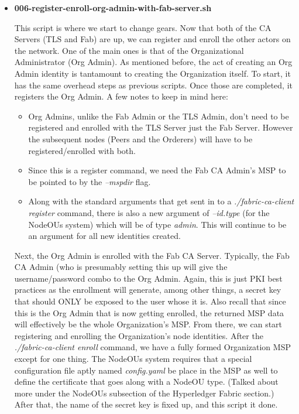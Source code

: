 \begin{itemize}
				\item \textbf{006-register-enroll-org-admin-with-fab-server.sh}
				
					\hspace{10mm}This script is where we start to change gears. Now that both of the CA Servers (TLS and Fab) are up, we can register and enroll the other actors on the network. One of the main ones is that of the Organizational Administrator (Org Admin). As mentioned before, the act of creating an Org Admin identity is tantamount to creating the Organization itself. To start, it has the same overhead steps as previous scripts. Once those are completed, it registers the Org Admin. A few notes to keep in mind here:
					
					\begin{itemize}
						\item Org Admins, unlike the Fab Admin or the TLS Admin, don't need to be registered and enrolled with the TLS Server just the Fab Server. However the subsequent nodes (Peers and the Orderers) will have to be registered/enrolled with both.
						\item Since this is a register command, we need the Fab CA Admin's MSP to be pointed to by the \textit{--mspdir} flag.
						\item Along with the standard arguments that get sent in to a \textit{./fabric-ca-client register} command, there is also a new argument of \textit{--id.type} (for the NodeOUs system) which will be of type \textit{admin}. This will continue to be an argument for all new identities created.
					\end{itemize}
					
					\hspace{10mm}Next, the Org Admin is enrolled with the Fab CA Server. Typically, the Fab CA Admin (who is presumably setting this up will give the username/password combo to the Org Admin. Again, this is just PKI best practices as the enrollment will generate, among other things, a secret key that should ONLY be exposed to the user whose it is. Also recall that since this is the Org Admin that is now getting enrolled, the returned MSP data will effectively be the whole Organization's MSP. From there, we can start registering and enrolling the Organization's node identities. After the \textit{./fabric-ca-client enroll} command, we have a fully formed Organization MSP except for one thing. The NodeOUs system requires that a special configuration file aptly named \textit{config.yaml} be place in the MSP as well to define the certificate that goes along with a NodeOU type. (Talked about more under the NodeOUs subsection of the Hyperledger Fabric section.) After that, the name of the secret key is fixed up, and this script it done.
					

\end{itemize}
